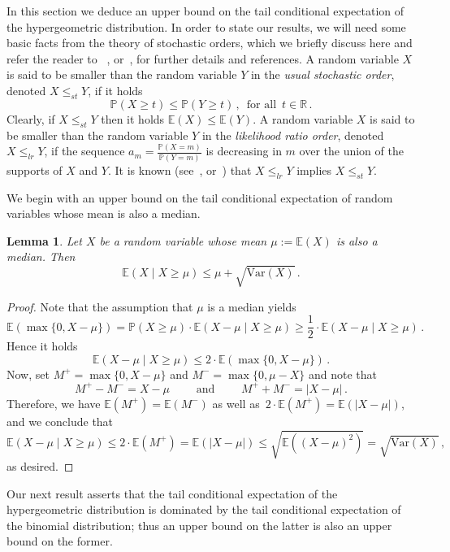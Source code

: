 \documentclass[10pt]{article}
\theoremstyle{plain}
\newtheorem{lemma}[theorem]{Lemma}
\theoremstyle{definition}
\theoremstyle{remark}
\newcommand{\Prb}{\mathbb{P}}
\newcommand{\Exp}{\mathbb{E}}
\begin{document}
In this section we deduce an upper bound on the tail conditional expectation of the hypergeometric distribution. 
In order to state our results, we will need  some basic facts from the theory of stochastic orders, which we briefly discuss here and refer the reader to 
~\cite{Shaked_Shantikumar}, or~\cite{Klenke_Mattner}, for further details and references. 
A random variable $X$ is said to be smaller than the random variable $Y$ in the \emph{usual stochastic order}, denoted $X\le_{st} Y$, if 
it holds 
\[
\Prb(X\ge t) \le \Prb(Y\ge t) \, ,\, \text{ for all } \, t\in \mathbb{R} \, .
\]
Clearly, if $X\le_{st} Y$ then it holds $\Exp(X)\le \Exp(Y)$. 
A random variable $X$  is said to be smaller than the random variable $Y$ in the \emph{likelihood ratio order}, denoted $X\le_{lr} Y$, if the sequence $a_m = \frac{\Prb(X=m)}{\Prb(Y=m)}$ is decreasing in $m$ over the union of the supports of $X$ and $Y$. It is known (see~\cite[Theorem~1.C.1]{Shaked_Shantikumar}, or~\cite{Klenke_Mattner}) that 
$X\le_{lr} Y$ implies $X\le_{st} Y$. 


We begin with an upper bound on the tail conditional expectation of random variables whose mean is also a median. 

\begin{lemma}\label{tce_median_bound}
Let $X$ be a random variable whose mean $\mu:=\Exp(X)$ is also a median. 
Then 
\[
\Exp(X\mid X\ge \mu) \le \mu + \sqrt{\text{Var}(X)} \, .
\]
\end{lemma}
\begin{proof} 
Note that the assumption that $\mu$ is a median yields   
\[
\Exp(\max\{0,X-\mu\}) = \Prb(X\ge \mu) \cdot \Exp(X-\mu\mid X\ge \mu) \ge \frac{1}{2} \cdot \Exp(X-\mu\mid X\ge \mu) \, .
\]
Hence it holds  
\[
 \Exp(X-\mu\mid X\ge \mu) \le 2\cdot \Exp(\max\{0,X-\mu\}) \, .
\]
Now, set $M^+ = \max\{0,X-\mu\}$ and $M^- = \max\{0, \mu-X\}$ and note that 
\[
M^+ - M^- = X-\mu \quad\quad\text{ and }\quad\quad 
M^+ + M^- = |X-\mu| \, .
\]
Therefore, we have $\Exp(M^+) = \Exp(M^-)$ as well as\, $2\cdot \Exp(M^+) =\Exp(|X-\mu|)$, and we conclude that  
\[
 \Exp(X-\mu\mid X\ge \mu) \le 2\cdot \Exp(M^+) = \Exp(|X-\mu|) \le \sqrt{\Exp((X-\mu)^2)} = \sqrt{\text{Var}(X)} \, ,
\]
as desired. 
\end{proof}




Our next result asserts that the tail conditional expectation of the hypergeometric distribution is dominated by the tail conditional expectation of the binomial distribution; thus an upper bound on the latter is also an upper bound on the former. 
\end{document}
